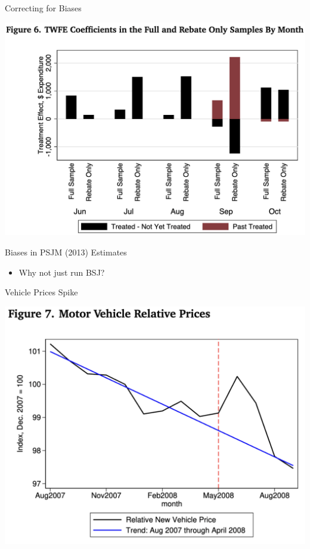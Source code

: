 \documentclass[english,xcolor=svgnames]{beamer}
\begin{document}
\begin{frame}{Correcting for Biases}
	\begin{center}
		\includegraphics[scale=0.4]{figures/ORWFIG6.png}
	 \end{center} 
\end{frame}

\begin{frame}{Biases in PSJM (2013) Estimates}
	\begin{itemize}
		\item Why not just run BSJ?
	\end{itemize}
	\end{frame}

\begin{frame}{Vehicle Prices Spike}
	\begin{center}
		\includegraphics[scale=0.4]{figures/ORWFIG7.png}
	 \end{center} 
\end{frame}
\end{document}

